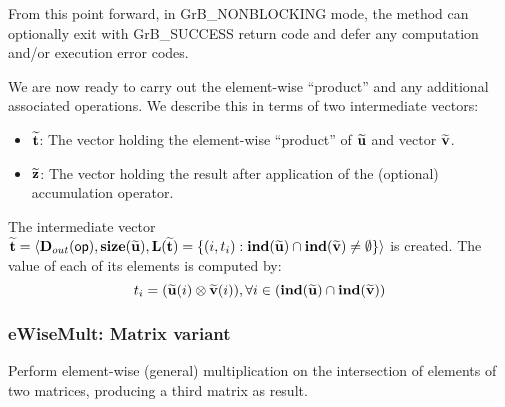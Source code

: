 From this point forward, in {\sf GrB\_NONBLOCKING} mode, the method can 
optionally exit with {\sf GrB\_SUCCESS} return code and defer any computation 
and/or execution error codes.

We are now ready to carry out the element-wise ``product'' and any additional 
associated operations.  We describe this in terms of two intermediate vectors:
\begin{itemize}
    \item ${\bf \widetilde{t}}$: The vector holding the element-wise ``product'' of
    ${\bf \widetilde{u}}$ and vector ${\bf \widetilde{v}}$.
    \item ${\bf \widetilde{z}}$: The vector holding the result after 
    application of the (optional) accumulation operator.
\end{itemize}

The intermediate vector ${\bf \widetilde{t}} = \langle
\mbox{$\mathbf{D}_{out}$}({\sf op}), \bold{size}({\bf \widetilde{u}}),
\bold{L}({\bf \widetilde{t}}) =
\{(i,t_i) : \bold{ind}({\bf \widetilde{u}}) \cap 
\bold{ind}({\bf \widetilde{v}})
 \neq \emptyset \} \rangle$
is created.  The value of each of its elements is computed by:
\[t_i = ({\bf \widetilde{u}}(i)
\otimes {\bf \widetilde{v}}(i)), \forall i \in 
(\bold{ind}({\bf \widetilde{u}}) \cap 
\bold{ind}({\bf \widetilde{v}}))\]








\subsubsection{{\sf eWiseMult}: Matrix variant}

Perform element-wise (general) multiplication on the intersection of elements 
of two matrices, producing a third matrix as result.

\paragraph{\syntax}

